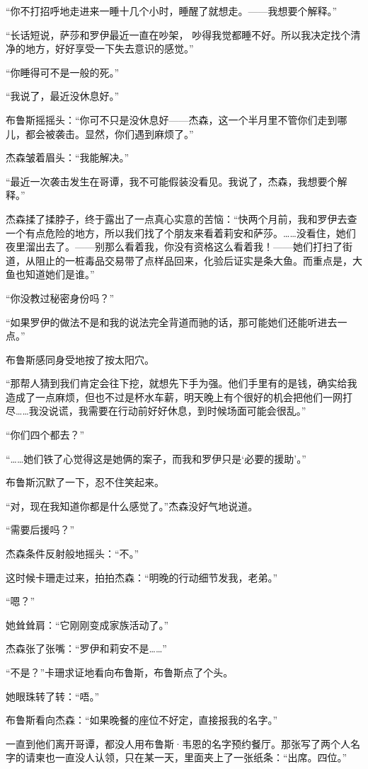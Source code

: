 \documentclass[../main]{subfiles}
\begin{document}
“你不打招呼地走进来一睡十几个小时，睡醒了就想走。——我想要个解释。”

“长话短说，萨莎和罗伊最近一直在吵架，
吵得我觉都睡不好。所以我决定找个清净的地方，好好享受一下失去意识的感觉。”

“你睡得可不是一般的死。”

“我说了，最近没休息好。”

布鲁斯摇摇头：“你可不只是没休息好——杰森，这一个半月里不管你们走到哪儿，都会被袭击。显然，你们遇到麻烦了。”

杰森皱着眉头：“我能解决。”

“最近一次袭击发生在哥谭，我不可能假装没看见。我说了，杰森，我想要个解释。”

杰森揉了揉脖子，终于露出了一点真心实意的苦恼：“快两个月前，我和罗伊去查一个有点危险的地方，所以我们找了个朋友来看着莉安和萨莎。……没看住，她们夜里溜出去了。——别那么看着我，你没有资格这么看着我！——她们打扫了街道，从阻止的一桩毒品交易带了点样品回来，化验后证实是条大鱼。而重点是，大鱼也知道她们是谁。”

“你没教过秘密身份吗？”

“如果罗伊的做法不是和我的说法完全背道而驰的话，那可能她们还能听进去一点。”

布鲁斯感同身受地按了按太阳穴。

“那帮人猜到我们肯定会往下挖，就想先下手为强。他们手里有的是钱，确实给我造成了一点麻烦，但也不过是杯水车薪，明天晚上有个很好的机会把他们一网打尽……我没说谎，我需要在行动前好好休息，到时候场面可能会很乱。”

“你们四个都去？”

“……她们铁了心觉得这是她俩的案子，而我和罗伊只是`必要的援助'。”

布鲁斯沉默了一下，忍不住笑起来。

“对，现在我知道你都是什么感觉了。”杰森没好气地说道。

“需要后援吗？”

杰森条件反射般地摇头：“不。”

这时候卡珊走过来，拍拍杰森：“明晚的行动细节发我，老弟。”

“嗯？”

她耸耸肩：“它刚刚变成家族活动了。”

杰森张了张嘴：“罗伊和莉安不是\ldots\ldots”

“不是？”卡珊求证地看向布鲁斯，布鲁斯点了个头。

她眼珠转了转：“唔。”

布鲁斯看向杰森：“如果晚餐的座位不好定，直接报我的名字。”

一直到他们离开哥谭，都没人用布鲁斯·韦恩的名字预约餐厅。那张写了两个人名字的请柬也一直没人认领，只在某一天，里面夹上了一张纸条：“出席。四位。”
\end{document}
